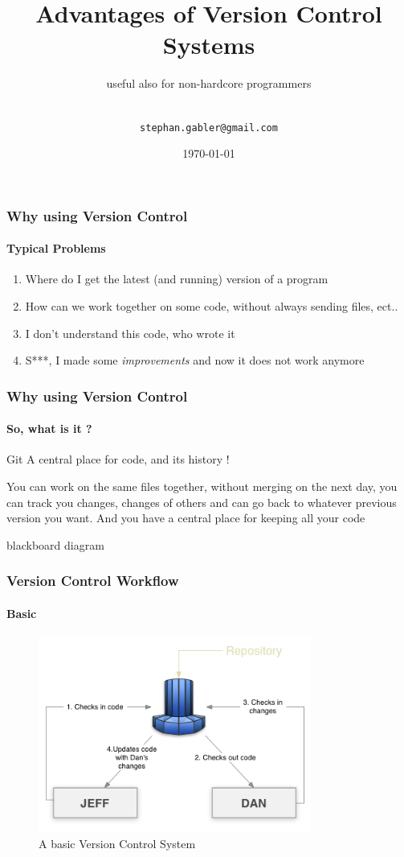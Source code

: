 \documentclass{beamer}
\title[Intro to GIT] {Advantages of Version Control Systems}
\subtitle{useful also for non-hardcore programmers}
\author[Stephan Gabler] { \\\texttt{stephan.gabler@gmail.com}}
\date{\today}
\begin{document}
\frame{\titlepage}


\begin{frame}
	\frametitle{Why using Version Control}
	\framesubtitle{Typical Problems}
	\begin{enumerate}
		\item<1-> Where do I get the latest (and running) version of a program
		\item<2-> How can we work together on some code, without always sending files, ect..
		\item<3-> I don't understand this code, who wrote it
		\item<4-> S***, I made some \emph{improvements} and now it does not work anymore 
	\end{enumerate}
\end{frame}


\begin{frame}
	\frametitle{Why using Version Control}
	\framesubtitle{So, what is it ?}
	
	\begin{block}{Git}
		A central place for code, and \alert{its history} !
	\end{block}

	You can work on the same files together, without merging on the next day,
	you can track you changes, changes of others and can go back to whatever
	previous version you want. And you have a central place for keeping all your code

	blackboard diagram
	
\end{frame}


\begin{frame}
    \frametitle{Version Control Workflow}
    \framesubtitle{Basic}
    \begin{figure}[h]
        \centering
            \includegraphics[width=0.8\textwidth]{scm_simple.png}
        \caption{A basic Version Control System}
        \label{sg:fig:scm_simple}
    \end{figure}
\end{frame}
\end{document}

